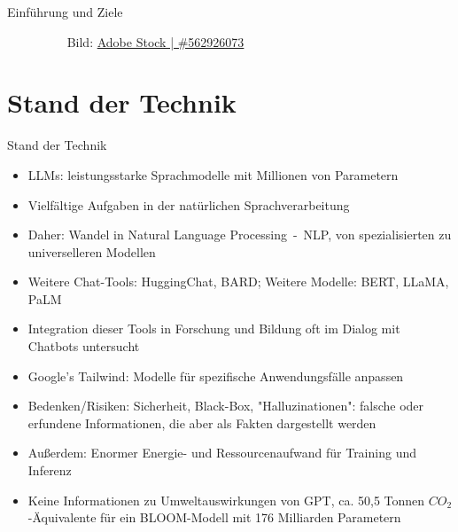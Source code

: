 \documentclass[10pt,aspectratio=169]{beamer}
\begin{document}
\begin{frame}{Einführung und Ziele}
\begin{minipage}{0.34\linewidth}
        \tiny
        ~~~~~~~~~ Bild: \hyperlink{https://stock.adobe.com/de/images/ai-copy-writing-bot-artificial-intelligence-copywriter-bot-using-chatgpt-by-open-ai-for-content-writing-holding-pencil/562926073}{Adobe Stock | \#562926073}
    \end{minipage}
\end{frame}



\section{Stand der Technik}
\begin{frame}{Stand der Technik}
    \begin{itemize}
        \item LLMs: leistungsstarke Sprachmodelle mit Millionen von Parametern
        \item Vielfältige Aufgaben in der natürlichen Sprachverarbeitung
        \item Daher: Wandel in Natural Language Processing~-~NLP, von spezialisierten zu universelleren Modellen
        \item Weitere Chat-Tools: HuggingChat, BARD; Weitere Modelle: BERT, LLaMA, PaLM
        \item Integration dieser Tools in Forschung und Bildung oft im Dialog mit Chatbots untersucht
        \item Google's Tailwind: Modelle für spezifische Anwendungsfälle anpassen
        \item Bedenken/Risiken: Sicherheit, Black-Box, "Halluzinationen": falsche oder erfundene Informationen, die aber als Fakten dargestellt werden
        \item Außerdem: Enormer Energie- und Ressourcenaufwand für Training und Inferenz
        \item Keine Informationen zu Umweltauswirkungen von GPT, ca. 50,5 Tonnen $CO_2$-Äquivalente für ein BLOOM-Modell mit 176 Milliarden Parametern
    \end{itemize}
\end{frame}
\end{document}

